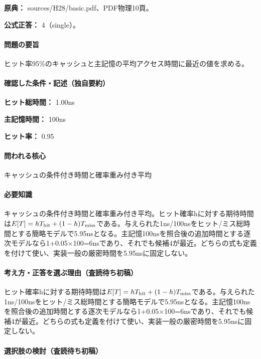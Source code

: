 \noindent\textbf{原典：} sources/H28/basic.pdf、PDF物理10頁。

\textbf{公式正答：} 4（single）。

\paragraph{問題の要旨} ヒット率95\%のキャッシュと主記憶の平均アクセス時間に最近の値を求める。

\paragraph{確認した条件・記述（独自要約）}\mbox{}\par

\noindent\textbf{ヒット総時間：} 1.00ns\par

\noindent\textbf{主記憶時間：} 100ns\par

\noindent\textbf{ヒット率：} 0.95\par

\paragraph{問われる核心} キャッシュの条件付き時間と確率重み付き平均

\paragraph{必要知識} キャッシュの条件付き時間と確率重み付き平均。ヒット確率hに対する期待時間は\(E[T]=hT_{\rm hit}+(1-h)T_{\rm miss}\)である。与えられた1ns/100nsをヒット/ミス総時間とする簡略モデルで5.95nsとなる。主記憶100nsを照合後の追加時間とする逐次モデルなら1+0.05×100=\allowbreak{}6nsであり、それでも候補4が最近。どちらの式も定義を付けて使い、実装一般の厳密時間を5.95nsに固定しない。

\paragraph{考え方・正答を選ぶ理由（査読待ち初稿）} ヒット確率hに対する期待時間は\(E[T]=hT_{\rm hit}+(1-h)T_{\rm miss}\)である。与えられた1ns/100nsをヒット/ミス総時間とする簡略モデルで5.95nsとなる。主記憶100nsを照合後の追加時間とする逐次モデルなら1+0.05×100=\allowbreak{}6nsであり、それでも候補4が最近。どちらの式も定義を付けて使い、実装一般の厳密時間を5.95nsに固定しない。

\paragraph{選択肢の検討（査読待ち初稿）}\mbox{}\par

